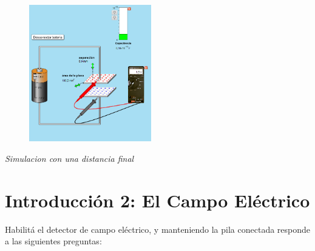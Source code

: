 \documentclass[12pt]{report}
\begin{document}
\begin{enumerate}
\begin{figure}[h]
    \centering
    \includegraphics[width=0.475\textwidth]{./images/1FOTO6.png}
\end{figure}
    \textit{Simulacion con una distancia final}

    \vspace{13cm}
\end{enumerate}

\section{Introducción 2: El Campo Eléctrico}

Habilitá el detector de campo eléctrico, y manteniendo la pila conectada responde a las siguientes preguntas:\\
\end{document}
